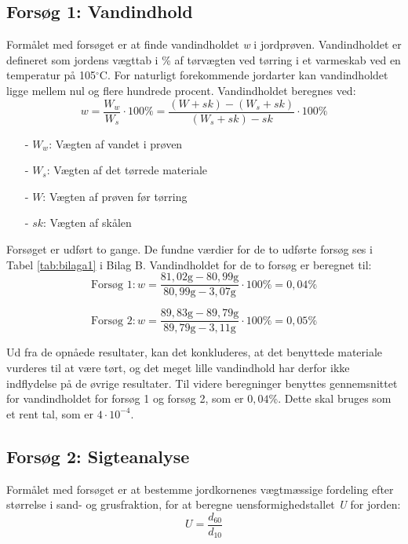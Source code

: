\subsection{Forsøg 1: Vandindhold}
Formålet med forsøget er at finde vandindholdet \textit{w} i jordprøven. Vandindholdet er defineret som jordens vægttab i \% af tørvægten ved tørring i et varmeskab ved en temperatur på 105$^{\circ}$C. For naturligt forekommende jordarter kan vandindholdet ligge mellem nul og flere hundrede procent.
\newline
\newline
Vandindholdet beregnes ved:
\begin{equation}
	w = \frac{W_w}{W_s}\cdot 100\% = \frac{(W+sk)-(W_s+sk)}{(W_s+sk)-sk}\cdot 100\%
\end{equation}

\begin{itemize}
	\item[-] $W_w$: Vægten af vandet i prøven
	\item[-] $W_s$: Vægten af det tørrede materiale
	\item[-] $W$: Vægten af prøven før tørring
	\item[-] $sk$: Vægten af skålen
\end{itemize}

Forsøget er udført to gange. De fundne værdier for de to udførte forsøg ses i Tabel \ref{tab:bilaga1} i Bilag B. Vandindholdet for de to forsøg er beregnet til:
\begin{equation}
	\text{Forsøg 1}: w = \frac{81,\!02 \text{g} - 80,\!99 \text{g}}{80,\!99 \text{g} - 3,\!07 \text{g}}\cdot 100\% = 0,\!04\%
\end{equation}

\begin{equation}
	\text{Forsøg 2}: w = \frac{89,\!83 \text{g} - 89,\!79 \text{g}}{89,\!79 \text{g} - 3,\!11 \text{g}}\cdot 100\% = 0,\!05\%
\end{equation}

Ud fra de opnåede resultater, kan det konkluderes, at det benyttede materiale vurderes til at være tørt, og det meget lille vandindhold har derfor ikke indflydelse på de øvrige resultater.
\newline \indent{     }  Til videre beregninger benyttes gennemsnittet for vandindholdet for forsøg 1 og forsøg 2, som er $0,\!04$\%. Dette skal bruges som et rent tal, som er $4 \cdot 10^{-4}$. 

\subsection{Forsøg 2: Sigteanalyse}
Formålet med forsøget er at bestemme jordkornenes vægtmæssige fordeling efter størrelse i sand- og grusfraktion, for at beregne uensformighedstallet \textit{U} for jorden:
\begin{equation}
	U = \frac{d_{60}}{d_{10}}
\end{equation}


